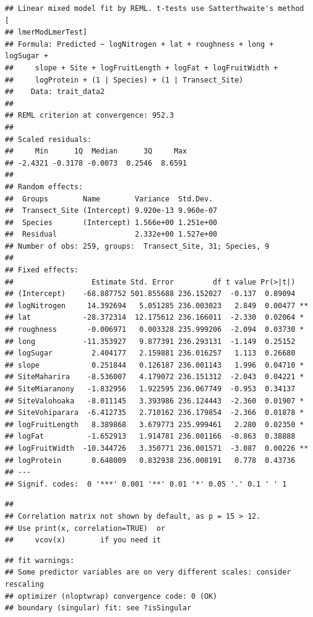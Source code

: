 \documentclass[
  12pt,
]{article}
\begin{document}
\begin{verbatim}
## Linear mixed model fit by REML. t-tests use Satterthwaite's method [
## lmerModLmerTest]
## Formula: Predicted ~ logNitrogen + lat + roughness + long + logSugar +  
##     slope + Site + logFruitLength + logFat + logFruitWidth +  
##     logProtein + (1 | Species) + (1 | Transect_Site)
##    Data: trait_data2
## 
## REML criterion at convergence: 952.3
## 
## Scaled residuals: 
##     Min      1Q  Median      3Q     Max 
## -2.4321 -0.3178 -0.0073  0.2546  8.6591 
## 
## Random effects:
##  Groups        Name        Variance  Std.Dev. 
##  Transect_Site (Intercept) 9.920e-13 9.960e-07
##  Species       (Intercept) 1.566e+00 1.251e+00
##  Residual                  2.332e+00 1.527e+00
## Number of obs: 259, groups:  Transect_Site, 31; Species, 9
## 
## Fixed effects:
##                  Estimate Std. Error         df t value Pr(>|t|)   
## (Intercept)    -68.887752 501.855688 236.152027  -0.137  0.89094   
## logNitrogen     14.392694   5.051285 236.003023   2.849  0.00477 **
## lat            -28.372314  12.175612 236.166011  -2.330  0.02064 * 
## roughness       -0.006971   0.003328 235.999206  -2.094  0.03730 * 
## long           -11.353927   9.877391 236.293131  -1.149  0.25152   
## logSugar         2.404177   2.159881 236.016257   1.113  0.26680   
## slope            0.251844   0.126187 236.001143   1.996  0.04710 * 
## SiteMaharira    -8.536007   4.179072 236.151312  -2.043  0.04221 * 
## SiteMiaranony   -1.832956   1.922595 236.067749  -0.953  0.34137   
## SiteValohoaka   -8.011145   3.393986 236.124443  -2.360  0.01907 * 
## SiteVohiparara  -6.412735   2.710162 236.179854  -2.366  0.01878 * 
## logFruitLength   8.389868   3.679773 235.999461   2.280  0.02350 * 
## logFat          -1.652913   1.914781 236.001166  -0.863  0.38888   
## logFruitWidth  -10.344726   3.350771 236.001571  -3.087  0.00226 **
## logProtein       0.648009   0.832938 236.008191   0.778  0.43736   
## ---
## Signif. codes:  0 '***' 0.001 '**' 0.01 '*' 0.05 '.' 0.1 ' ' 1
\end{verbatim}

\begin{verbatim}
## 
## Correlation matrix not shown by default, as p = 15 > 12.
## Use print(x, correlation=TRUE)  or
##     vcov(x)        if you need it
\end{verbatim}

\begin{verbatim}
## fit warnings:
## Some predictor variables are on very different scales: consider rescaling
## optimizer (nloptwrap) convergence code: 0 (OK)
## boundary (singular) fit: see ?isSingular
\end{verbatim}
\end{document}
